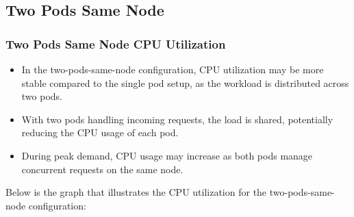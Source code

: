 \subsection{Two Pods Same Node}
\subsubsection{Two Pods Same Node CPU Utilization}
\begin{itemize}
    \item In the two-pods-same-node configuration, CPU utilization may be more stable compared to the single pod setup, as the workload is distributed across two pods.
    \item With two pods handling incoming requests, the load is shared, potentially reducing the CPU usage of each pod.
    \item During peak demand, CPU usage may increase as both pods manage concurrent requests on the same node.
\end{itemize}

\noindent Below is the graph that illustrates the CPU utilization for the two-pods-same-node configuration:

